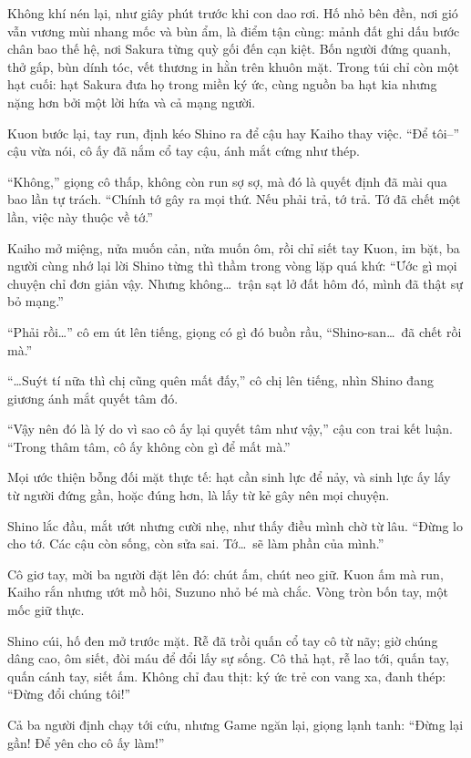 \documentclass[../main.tex]{subfiles}
\begin{document}
Không khí nén lại, như giây phút trước khi con dao rơi. Hố nhỏ bên đền, nơi gió vẫn vương mùi nhang mốc và bùn ẩm, là điểm tận cùng: mảnh đất ghi dấu bước chân bao thế hệ, nơi Sakura từng quỳ gối đến cạn kiệt. Bốn người đứng quanh, thở gấp, bùn dính tóc, vết thương in hằn trên khuôn mặt. Trong túi chỉ còn một hạt cuối: hạt Sakura đưa họ trong miền ký ức, cùng nguồn ba hạt kia nhưng nặng hơn bởi một lời hứa và cả mạng người.

Kuon bước lại, tay run, định kéo Shino ra để cậu hay Kaiho thay việc. ``Để tôi--'' cậu vừa nói, cô ấy đã nắm cổ tay cậu, ánh mắt cứng như thép.

``Không,'' giọng cô thấp, không còn run sợ sợ, mà đó là quyết định đã mài qua bao lần tự trách. ``Chính tớ gây ra mọi thứ. Nếu phải trả, tớ trả. Tớ đã chết một lần, việc này thuộc về tớ.''

Kaiho mở miệng, nửa muốn cản, nửa muốn ôm, rồi chỉ siết tay Kuon, im bặt, ba người cùng nhớ lại lời Shino từng thì thầm trong vòng lặp quá khứ: ``Ước gì mọi chuyện chỉ đơn giản vậy. Nhưng không\dots\ trận sạt lở đất hôm đó, mình đã thật sự bỏ mạng.''

``Phải rồi\dots'' cô em út lên tiếng, giọng có gì đó buồn rầu, ``Shino-san\dots\ đã chết rồi mà.''

``\dots Suýt tí nữa thì chị cũng quên mất đấy,'' cô chị lên tiếng, nhìn Shino đang giương ánh mắt quyết tâm đó.

``Vậy nên đó là lý do vì sao cô ấy lại quyết tâm như vậy,'' cậu con trai kết luận. ``Trong thâm tâm, cô ấy không còn gì để mất mà.''

Mọi ước thiện bỗng đối mặt thực tế: hạt cần sinh lực để nảy, và sinh lực ấy lấy từ người đứng gần, hoặc đúng hơn, là lấy từ kẻ gây nên mọi chuyện.

Shino lắc đầu, mắt ướt nhưng cười nhẹ, như thấy điều mình chờ từ lâu. ``Đừng lo cho tớ. Các cậu còn sống, còn sửa sai. Tớ\dots\ sẽ làm phần của mình.''

Cô giơ tay, mời ba người đặt lên đó: chút ấm, chút neo giữ. Kuon ấm mà run, Kaiho rắn nhưng ướt mồ hôi, Suzuno nhỏ bé mà chắc. Vòng tròn bốn tay, một mốc giữ thực.

Shino cúi, hố đen mở trước mặt. Rễ đã trồi quấn cổ tay cô từ nãy; giờ chúng dâng cao, ôm siết, đòi máu để đổi lấy sự sống. Cô thả hạt, rễ lao tới, quấn tay, quấn cánh tay, siết ấm. Không chỉ đau thịt: ký ức trẻ con vang xa, đanh thép: ``Đừng đổi chúng tôi!''

Cả ba người định chạy tới cứu, nhưng Game ngăn lại, giọng lạnh tanh: ``Đừng lại gần! Để yên cho cô ấy làm!''
\end{document}
